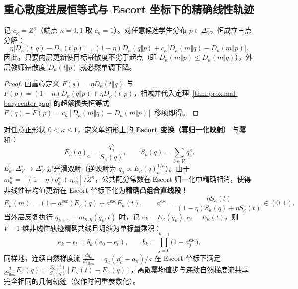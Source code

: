 \documentclass[lang=cn,scheme=chinese,openany]{elegantbook}
\begin{document}
\subsection{重心散度进展恒等式与 Escort 坐标下的精确线性轨迹}

\begin{theorem}[教师幂散度的有限内层进展恒等式]
\label{thm:proximal-teacher-progress}
记 $c_\kappa=Z^\kappa$（端点 $\kappa=0,1$ 取 $c_\kappa=1$）。对任意候选学生分布 $p\in\Delta_V^\circ$，恒成立三点分解：
\begin{equation}
 \eta\bigl[D_\kappa(t\Vert q)-D_\kappa(t\Vert p)\bigr]
 =(1-\eta)D_\kappa(q\Vert p)
 +c_\kappa\bigl[D_\kappa(m\Vert q)-D_\kappa(m\Vert p)\bigr].
 \label{eq:proximal-progress-identity}
\end{equation}
因此，只要内层更新使目标幂散度不劣于起点（即 $D_\kappa(m\Vert p)\le D_\kappa(m\Vert q)$），外层教师幂散度 $D_\kappa(t\Vert p)$ 就必然单调下降。
\end{theorem}
\begin{proof}
由重心定义 $F(q)=\eta D_\kappa(t\Vert q)$ 与 $F(p)=(1-\eta)D_\kappa(q\Vert p)+\eta D_\kappa(t\Vert p)$，相减并代入定理~\ref{thm:proximal-barycenter-gap} 的超额损失恒等式 $F(q)-F(p)=c_\kappa[D_\kappa(m\Vert q)-D_\kappa(m\Vert p)]$ 移项即得。
\end{proof}

对任意正形状 $0<\kappa\le 1$，定义单纯形上的 \textbf{Escort 变换（幂归一化映射）} 与幂和：
\begin{equation}
 E_\kappa(q)_a=\frac{q_a^\kappa}{S_\kappa(q)},\qquad
 S_\kappa(q)=\sum_{b\in\mathcal V} q_b^\kappa.
\end{equation}
$E_\kappa:\Delta_V^\circ\to\Delta_V^\circ$ 是光滑双射（逆映射为 $q_a\propto E_\kappa(q)_a^{1/\kappa}$）。由于 $m_a^\kappa=[(1-\eta)q_a^\kappa+\eta t_a^\kappa]/Z^\kappa$，公共配分常数在 Escort 归一化中精确相消，使得非线性幂均值更新在 Escort 坐标下化为\textbf{精确凸组合直线段}！
\begin{equation}
 E_\kappa(m)=(1-a^{\mathrm{esc}})E_\kappa(q)+a^{\mathrm{esc}}E_\kappa(t),\qquad
 a^{\mathrm{esc}}=\frac{\eta S_\kappa(t)}{(1-\eta)S_\kappa(q)+\eta S_\kappa(t)}\in(0,1).
 \label{eq:proximal-escort-step}
\end{equation}
当外层反复执行 $q_{k+1}=m_{\kappa,\eta}(q_k,t)$ 时，记 $e_k=E_\kappa(q_k), e_t=E_\kappa(t)$，则 $V-1$ 维非线性轨迹精确共线且坍缩为单标量乘积：
\begin{equation}
 e_k-e_t=b_k(e_0-e_t),\qquad
 b_k=\prod_{j=0}^{k-1}\bigl(1-a_j^{\mathrm{esc}}\bigr).
 \label{eq:proximal-escort-orbit}
\end{equation}
同样地，连续自然梯度流 $\frac{dq_a}{d\tau_{\mathrm{flow}}}=q_a(\rho_a^\kappa-a_\kappa)/\kappa$ 在 Escort 坐标下满足 $\frac{d}{d\tau_{\mathrm{flow}}}E_\kappa(q)=\frac{S_\kappa(t)}{S_\kappa(q)}[E_\kappa(t)-E_\kappa(q)]$，离散幂均值步与连续自然梯度流共享完全相同的几何轨迹（仅作时间重参数化）。
\end{document}
